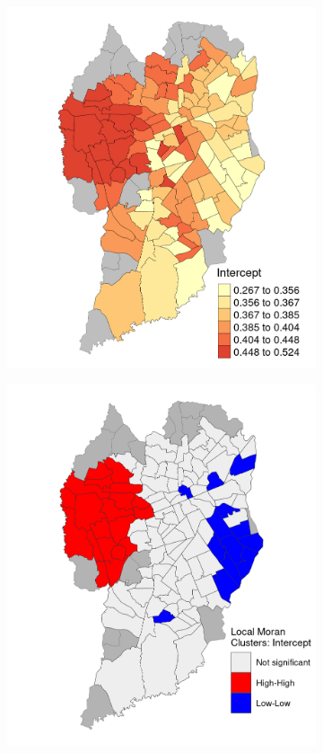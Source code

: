 \begin{figure}[!htbp]
    \centering\footnotesize
    \captionsetup{font=footnotesize}
    \caption{MODEL INTERCEPT ESTIMATES}
    \begin{subfigure}{0.5\textwidth}
        \includegraphics{fig/Intercept.png}
    \end{subfigure}%
    \begin{subfigure}{0.5\textwidth}
        \includegraphics{fig/lisa_Intercept.png}

\end{subfigure}
\end{figure}

